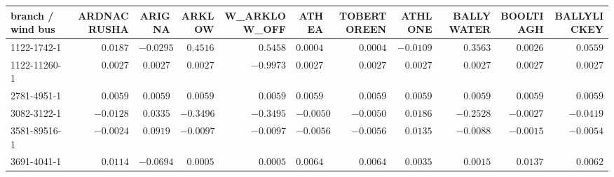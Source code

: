 \setlength{\tabcolsep}{3pt}\renewcommand{\arraystretch}{1.05}
\begin{tabular}{l|rrrrrrrrrr}
{\tiny branch / wind bus} & {\tiny ARDNACRUSHA} & {\tiny ARIGNA} & {\tiny ARKLOW} & {\tiny W\_ARKLOW\_OFF} & {\tiny ATHEA} & {\tiny TOBERTOREEN} & {\tiny ATHLONE} & {\tiny BALLYWATER} & {\tiny BOOLTIAGH} & {\tiny BALLYLICKEY}\\ \hline
{\tiny 1122-1742-1} & $0.0187$ & $-0.0295$ & $0.4516$ & $0.5458$ & $0.0004$ & $0.0004$ & $-0.0109$ & $0.3563$ & $0.0026$ & $0.0559$\\
{\tiny 1122-11260-1} & $0.0027$ & $0.0027$ & $0.0027$ & $-0.9973$ & $0.0027$ & $0.0027$ & $0.0027$ & $0.0027$ & $0.0027$ & $0.0027$\\
{\tiny 2781-4951-1} & $0.0059$ & $0.0059$ & $0.0059$ & $0.0059$ & $0.0059$ & $0.0059$ & $0.0059$ & $0.0059$ & $0.0059$ & $0.0059$\\
{\tiny 3082-3122-1} & $-0.0128$ & $0.0335$ & $-0.3496$ & $-0.3495$ & $-0.0050$ & $-0.0050$ & $0.0186$ & $-0.2528$ & $-0.0027$ & $-0.0419$\\
{\tiny 3581-89516-1} & $-0.0024$ & $0.0919$ & $-0.0097$ & $-0.0097$ & $-0.0056$ & $-0.0056$ & $0.0135$ & $-0.0088$ & $-0.0015$ & $-0.0054$\\
{\tiny 3691-4041-1} & $0.0114$ & $-0.0694$ & $0.0005$ & $0.0005$ & $0.0064$ & $0.0064$ & $0.0035$ & $0.0015$ & $0.0137$ & $0.0062$
\end{tabular}
